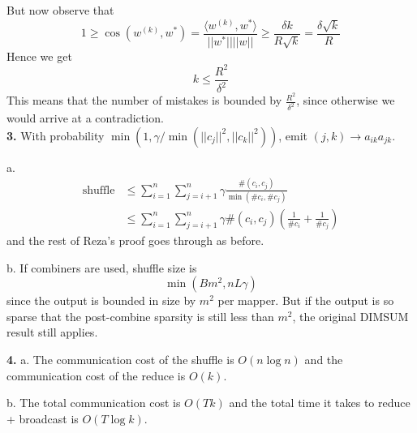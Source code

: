 \documentclass[11pt]{article}
\begin{document}
But now observe that
\[
1 \geq \cos(w^{(k)}, w^*) = \frac{\langle w^{(k)}, w^* \rangle}{||w^*|| ||w||} \geq \frac{\delta k}{R\sqrt{k}} = \frac{\delta \sqrt{k}}{R}
\]
Hence we get
\[
k \leq \frac{R^2}{\delta^2}
\]
This means that the number of mistakes is bounded by $\frac{R^2}{\delta^2}$, since otherwise we would arrive at a contradiction.\\


\noindent\textbf{3.}
With probability $\min(1, \gamma/\min(||c_j||^2, ||c_k||^2))$, emit $(j, k) \to a_{ik}a_{jk}$.

a.
\begin{align*}
\text{shuffle} &\leq \sum_{i=1}^n \sum_{j = i+1}^n \gamma \frac{\# (c_i, c_j)}{\min(\# c_i, \# c_j)}\\
& \leq \sum_{i=1}^n \sum_{j = i+1}^n \gamma \# (c_i, c_j) \left(\frac{1}{\# c_i} + \frac{1}{\# c_j}\right)
\end{align*}
and the rest of Reza's proof goes through as before.

b.
If combiners are used, shuffle size is
\[
\min(Bm^2, nL\gamma)
\]
since the output is bounded in size by $m^2$ per mapper.  But if the
output is so sparse that the post-combine sparsity is still less than
$m^2$, the original DIMSUM result still applies.

\noindent\textbf{4.}
a. The communication cost of the shuffle is $O(n\log n)$ and the communication cost of the reduce is $O(k)$.

b. The total communication cost is $O(Tk)$ and the total time it takes to reduce + broadcast is $O(T\log k)$.
\end{document}
